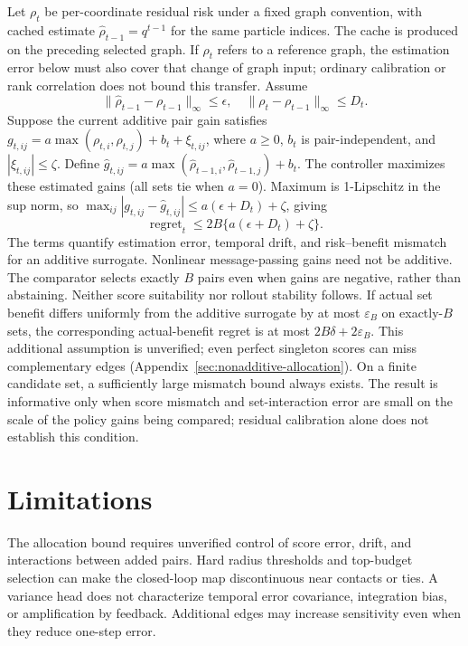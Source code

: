 Let $\rho_t$ be per-coordinate residual risk under a fixed graph convention, with cached estimate $\widehat\rho_{t-1}=q^{t-1}$ for the same particle indices. The cache is produced on the preceding selected graph. If $\rho_t$ refers to a reference graph, the estimation error below must also cover that change of graph input; ordinary calibration or rank correlation does not bound this transfer. Assume
\begin{equation}
 \|\widehat\rho_{t-1}-\rho_{t-1}\|_\infty\le\epsilon,
 \quad \|\rho_t-\rho_{t-1}\|_\infty\le D_t.
\end{equation}
Suppose the current additive pair gain satisfies
$g_{t,ij}=a\max(\rho_{t,i},\rho_{t,j})+b_t+\xi_{t,ij}$,
where $a\ge0$, $b_t$ is pair-independent, and $|\xi_{t,ij}|\le\zeta$. Define $\widehat g_{t,ij}=a\max(\widehat\rho_{t-1,i},\widehat\rho_{t-1,j})+b_t$. The controller maximizes these estimated gains (all sets tie when $a=0$). Maximum is 1-Lipschitz in the sup norm, so $\max_{ij}|g_{t,ij}-\widehat g_{t,ij}|\le a(\epsilon+D_t)+\zeta$, giving
\begin{equation}
 \operatorname{regret}_t\le 2B\{a(\epsilon+D_t)+\zeta\}.
\end{equation}
The terms quantify estimation error, temporal drift, and risk--benefit mismatch for an additive surrogate. Nonlinear message-passing gains need not be additive. The comparator selects exactly $B$ pairs even when gains are negative, rather than abstaining. Neither score suitability nor rollout stability follows.
If actual set benefit differs uniformly from the additive surrogate by at most $\varepsilon_B$ on exactly-$B$ sets, the corresponding actual-benefit regret is at most $2B\delta+2\varepsilon_B$. This additional assumption is unverified; even perfect singleton scores can miss complementary edges (Appendix~\ref{sec:nonadditive-allocation}).
On a finite candidate set, a sufficiently large mismatch bound always exists. The result is informative only when score mismatch and set-interaction error are small on the scale of the policy gains being compared; residual calibration alone does not establish this condition.


\section{Limitations}
The allocation bound requires unverified control of score error, drift, and interactions between added pairs. Hard radius thresholds and top-budget selection can make the closed-loop map discontinuous near contacts or ties. A variance head does not characterize temporal error covariance, integration bias, or amplification by feedback. Additional edges may increase sensitivity even when they reduce one-step error.

